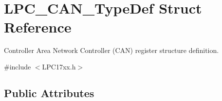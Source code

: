 \hypertarget{struct_l_p_c___c_a_n___type_def}{\section{\-L\-P\-C\-\_\-\-C\-A\-N\-\_\-\-Type\-Def \-Struct \-Reference}
\label{struct_l_p_c___c_a_n___type_def}
}


\-Controller \-Area \-Network \-Controller (\-C\-A\-N) register structure definition.  




{\ttfamily \#include $<$\-L\-P\-C17xx.\-h$>$}

\subsection*{\-Public \-Attributes}
